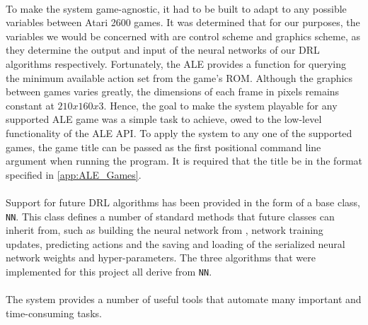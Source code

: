 \paragraph{}

To make the system game-agnostic, it had to be built to adapt to any possible variables between Atari 2600 games. It was determined that for our purposes, the variables we would be concerned with are control scheme and graphics scheme, as they determine the output and input of the neural networks of our DRL algorithms respectively. Fortunately, the ALE provides a function for querying the minimum available action set from the game's ROM. Although the graphics between games varies greatly, the dimensions of each frame in pixels remains constant at $210x160x3$. Hence, the goal to make the system playable for any supported ALE game was a simple task to achieve, owed to the low-level functionality of the ALE API. To apply the system to any one of the supported games, the game title can be passed as the first positional command line argument when running the program. It is required that the title be in the format specified in \ref{app:ALE_Games}. \paragraph{}

Support for future DRL algorithms has been provided in the form of a base class, \texttt{NN}. This class defines a number of standard methods that future classes can inherit from, such as building the neural network from \citet{human}, network training updates, predicting actions and the saving and loading of the serialized neural network weights and hyper-parameters. The three algorithms that were implemented for this project all derive from \texttt{NN}. \paragraph{}

The system provides a number of useful tools that automate many important and time-consuming tasks.

